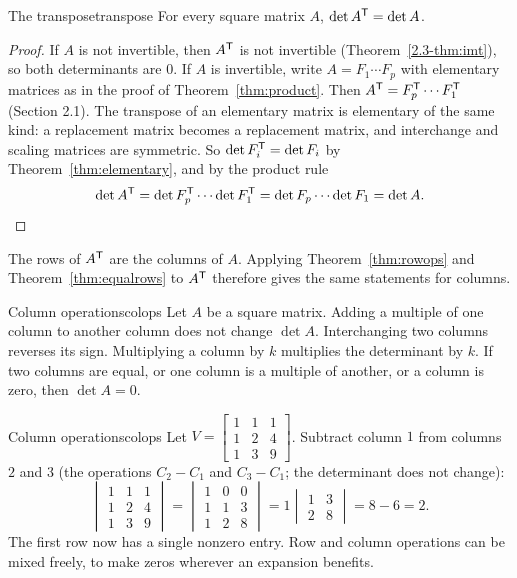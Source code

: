 \documentclass[11pt]{article}
\begin{document}
\begin{thm}{The transpose}{transpose}
For every square matrix $A$, $\det A^{\mathsf T}=\det A$.
\end{thm}

\begin{proof}
If $A$ is not invertible, then $A^{\mathsf T}$ is not invertible (Theorem~\ref{2.3-thm:imt}), so both determinants are $0$. If $A$ is invertible, write $A=F_1\cdots F_p$ with elementary matrices as in the proof of Theorem~\ref{thm:product}. Then $A^{\mathsf T}=F_p^{\mathsf T}\cdots F_1^{\mathsf T}$ (Section 2.1). The transpose of an elementary matrix is elementary of the same kind: a replacement matrix becomes a replacement matrix, and interchange and scaling matrices are symmetric. So $\det F_i^{\mathsf T}=\det F_i$ by Theorem~\ref{thm:elementary}, and by the product rule
\[
\det A^{\mathsf T}=\det F_p^{\mathsf T}\cdots\det F_1^{\mathsf T}=\det F_p\cdots\det F_1=\det A.
\]
\end{proof}

The rows of $A^{\mathsf T}$ are the columns of $A$. Applying Theorem~\ref{thm:rowops} and Theorem~\ref{thm:equalrows} to $A^{\mathsf T}$ therefore gives the same statements for columns.

\begin{thm}{Column operations}{colops}
Let $A$ be a square matrix. Adding a multiple of one column to another column does not change $\det A$. Interchanging two columns reverses its sign. Multiplying a column by $k$ multiplies the determinant by $k$. If two columns are equal, or one column is a multiple of another, or a column is zero, then $\det A=0$.
\end{thm}

\begin{exmp}{Column operations}{colops}
Let $V=\begin{bmatrix}1&1&1\\1&2&4\\1&3&9\end{bmatrix}$. Subtract column $1$ from columns $2$ and $3$ (the operations $C_2-C_1$ and $C_3-C_1$; the determinant does not change):
\[
\begin{vmatrix}1&1&1\\1&2&4\\1&3&9\end{vmatrix}=\begin{vmatrix}1&0&0\\1&1&3\\1&2&8\end{vmatrix}=1\begin{vmatrix}1&3\\2&8\end{vmatrix}=8-6=2.
\]
The first row now has a single nonzero entry. Row and column operations can be mixed freely, to make zeros wherever an expansion benefits.
\end{exmp}
\end{document}
